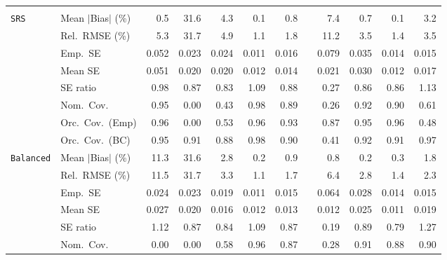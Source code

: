 \begin{landscape}
\begin{longtable}{llrrrrrrrrrr}
\addlinespace[2pt]
\multicolumn{12}{l}{\textbf{Continuous Phase-One Covariates}} \\
\addlinespace[2pt]
\quad \texttt{SRS} & Mean $|$Bias$|$ (\%) & \cellcolor{ranktwo}0.5 & 31.6 & 4.3 & \cellcolor{rankone}0.1 & 0.8 &  & 7.4 & \cellcolor{rankthree}0.7 & \cellcolor{rankone}0.1 & 3.2 \\
 & Rel.\ RMSE (\%) & 5.3 & 31.7 & 4.9 & \cellcolor{rankone}1.1 & \cellcolor{rankthree}1.8 &  & 11.2 & 3.5 & \cellcolor{ranktwo}1.4 & 3.5 \\
 & Emp.\ SE & 0.052 & 0.023 & 0.024 & 0.011 & 0.016 &  & 0.079 & 0.035 & 0.014 & 0.015 \\
 & Mean SE & 0.051 & 0.020 & 0.020 & 0.012 & 0.014 &  & 0.021 & 0.030 & 0.012 & 0.017 \\
 & SE ratio & \cellcolor{rankone}0.98 & 0.87 & 0.83 & \cellcolor{ranktwo}1.09 & \cellcolor{rankthree}0.88 &  & 0.27 & 0.86 & 0.86 & 1.13 \\
 & Nom.\ Cov. & \cellcolor{rankone}0.95 & 0.00 & 0.43 & \cellcolor{ranktwo}0.98 & 0.89 &  & 0.26 & \cellcolor{ranktwo}0.92 & \cellcolor{rankthree}0.90 & 0.61 \\
 & Orc.\ Cov.\ (Emp) & \cellcolor{ranktwo}0.96 & 0.00 & 0.53 & \cellcolor{ranktwo}0.96 & \cellcolor{rankthree}0.93 &  & 0.87 & \cellcolor{rankone}0.95 & \cellcolor{ranktwo}0.96 & 0.48 \\
 & Orc.\ Cov.\ (BC) & \cellcolor{rankone}0.95 & 0.91 & 0.88 & \cellcolor{rankthree}0.98 & 0.90 &  & 0.41 & \cellcolor{rankthree}0.92 & 0.91 & \cellcolor{ranktwo}0.97 \\
\addlinespace[2pt]
\quad \texttt{Balanced} & Mean $|$Bias$|$ (\%) & 11.3 & 31.6 & 2.8 & \cellcolor{rankone}0.2 & 0.9 &  & \cellcolor{rankthree}0.8 & \cellcolor{rankone}0.2 & \cellcolor{ranktwo}0.3 & 1.8 \\
 & Rel.\ RMSE (\%) & 11.5 & 31.7 & 3.3 & \cellcolor{rankone}1.1 & \cellcolor{rankthree}1.7 &  & 6.4 & 2.8 & \cellcolor{ranktwo}1.4 & 2.3 \\
 & Emp.\ SE & 0.024 & 0.023 & 0.019 & 0.011 & 0.015 &  & 0.064 & 0.028 & 0.014 & 0.015 \\
 & Mean SE & 0.027 & 0.020 & 0.016 & 0.012 & 0.013 &  & 0.012 & 0.025 & 0.011 & 0.019 \\
 & SE ratio & \cellcolor{rankthree}1.12 & 0.87 & 0.84 & \cellcolor{rankone}1.09 & 0.87 &  & 0.19 & \cellcolor{ranktwo}0.89 & 0.79 & 1.27 \\
 & Nom.\ Cov. & 0.00 & 0.00 & 0.58 & \cellcolor{rankone}0.96 & 0.87 &  & 0.28 & \cellcolor{ranktwo}0.91 & 0.88 & \cellcolor{rankthree}0.90 \\

\end{longtable}
\end{landscape}
